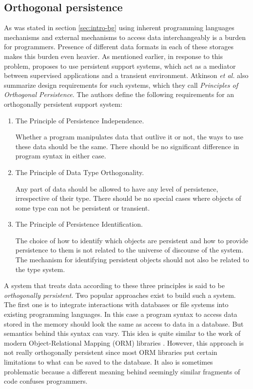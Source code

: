 \subsection{Orthogonal persistence}
\label{sec:LR:orth-persistence}

As was stated in section \ref{sec:intro-bg} using inherent programming
languages mechanisms and external mechanisms to access data interchangeably is
a burden for programmers. Presence of different data formats in each of these
storages makes this burden even heavier. As mentioned earlier, in response to
this problem, \cite{atkinson1995orthogonally} proposes to use persistent
support systems, which act as a mediator between supervised applications and
a transient environment. Atkinson \textit{et al.} also summarize design
requirements for such systems, which they call \textit{Principles of Orthogonal
Persistence}. The authors define the following requirements for an orthogonally
persistent support system: 

\begin{enumerate}
    \item The Principle of Persistence Independence. 
    
    Whether a program manipulates data that outlive it or not, the ways to use
    these data should be the same. There should be no significant difference in
    program syntax in either case.

    \item The Principle of Data Type Orthogonality. 
    
    Any part of data should be allowed to have any level of persistence, 
    irrespective of their type. There should be no special cases where objects
    of some type can not be persistent or transient.
    
    \item  The Principle of Persistence Identification. 
    
    The choice of how to identify which objects are persistent and how to
    provide persistence to them is not related to the universe of discourse of
    the system. The mechanism for identifying persistent objects should not also
    be related to the type system.

\end{enumerate}

A system that treats data according to these three principles is said to be
\textit{orthogonally persistent}. Two popular approaches exist to build such a
system. The first one is to integrate interactions with databases or file
systems into existing programming languages. In this case a program syntax to
access data stored in the memory should look the same as access to data in a
database. But semantics behind this syntax can vary. This idea is quite similar
to the work of modern Object-Relational Mapping (ORM) libraries
\cite{аннин2018краткий,copeland2008essential}. However, this approach is not
really orthogonally persistent since most ORM libraries put certain limitations
to what can be saved to the database. It also is sometimes problematic because a
different meaning behind seemingly similar fragments of code confuses
programmers.

